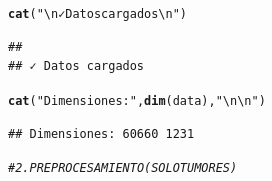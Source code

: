 \documentclass{article}\usepackage[]{graphicx}\usepackage[]{xcolor}
\makeatletter
\newcommand{\hlsng}[1]{\textcolor[rgb]{0.192,0.494,0.8}{#1}}%
\newcommand{\hlcom}[1]{\textcolor[rgb]{0.678,0.584,0.686}{\textit{#1}}}%
\newcommand{\hldef}[1]{\textcolor[rgb]{0.345,0.345,0.345}{#1}}%
\newcommand{\hlkwd}[1]{\textcolor[rgb]{0.737,0.353,0.396}{\textbf{#1}}}%
\newenvironment{kframe}{%
 \def\at@end@of@kframe{}%
 \ifinner\ifhmode%
  \def\at@end@of@kframe{\end{minipage}}%
  \begin{minipage}{\columnwidth}%
 \fi\fi%
 \def\FrameCommand##1{\hskip\@totalleftmargin \hskip-\fboxsep
 \colorbox{shadecolor}{##1}\hskip-\fboxsep
     \hskip-\linewidth \hskip-\@totalleftmargin \hskip\columnwidth}%
 \MakeFramed {\advance\hsize-\width
   \@totalleftmargin\z@ \linewidth\hsize
   \@setminipage}}%
 {\par\unskip\endMakeFramed%
 \at@end@of@kframe}
\newenvironment{knitrout}{}{} %
\makeatother
\begin{document}
\begin{knitrout}
\begin{kframe}
{\ttfamily\noindent\itshape\color{messagecolor}{\#\# Available assays in SummarizedExperiment : \\\#\# \ \ => unstranded\\\#\# \ \ => stranded\_first\\\#\# \ \ => stranded\_second\\\#\# \ \ => tpm\_unstrand\\\#\# \ \ => fpkm\_unstrand\\\#\# \ \ => fpkm\_uq\_unstrand}}\begin{alltt}
\hlkwd{cat}\hldef{(}\hlsng{"\textbackslash{}n✓ Datos cargados\textbackslash{}n"}\hldef{)}
\end{alltt}
\begin{verbatim}
## 
## ✓ Datos cargados
\end{verbatim}
\begin{alltt}
\hlkwd{cat}\hldef{(}\hlsng{"Dimensiones:"}\hldef{,} \hlkwd{dim}\hldef{(data),} \hlsng{"\textbackslash{}n\textbackslash{}n"}\hldef{)}
\end{alltt}
\begin{verbatim}
## Dimensiones: 60660 1231
\end{verbatim}
\end{kframe}
\end{knitrout}
\begin{knitrout}
\color{fgcolor}\begin{kframe}
\begin{alltt}
\hlcom{# 2. PREPROCESAMIENTO (SOLO TUMORES)}
\end{alltt}
\end{kframe}
\end{knitrout}
\end{document}
